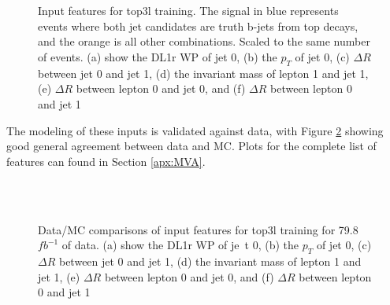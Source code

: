 \begin{figure}[H]
    \centering
    \\
    \\
    \caption{Input features for top3l training. The signal in blue represents events where both jet candidates are truth b-jets from top decays, and the orange is all other combinations. Scaled to the same number of events. (a) show the DL1r WP of jet 0, (b) the $p_T$ of jet 0, (c) $\Delta R$ between jet 0 and jet 1, (d) the invariant mass of lepton 1 and jet 1, (e) $\Delta R$ between lepton 0 and jet 0, and (f) $\Delta R$ between lepton 0 and jet 1}
    \label{fig:features_top3l}
\end{figure}

The modeling of these inputs is validated against data, with Figure \ref{fig:model_top3l} showing good general agreement between data and MC. Plots for the complete list of features can found in Section \ref{apx:MVA}.

\begin{figure}[H]                                                                                                         
    \centering
    \\
    \\
    \caption{Data/MC comparisons of input features for top3l training for 79.8 $fb^{-1}$ of data. (a) show the DL1r WP of je\
t 0, (b) the $p_T$ of jet 0, (c) $\Delta R$ between jet 0 and jet 1, (d) the invariant mass of lepton 1 and jet 1, (e) $\Delta R$ between lepton 0 and jet 0, and (f) $\Delta R$ between lepton 0 and jet 1}
    \label{fig:model_top3l}
\end{figure}


